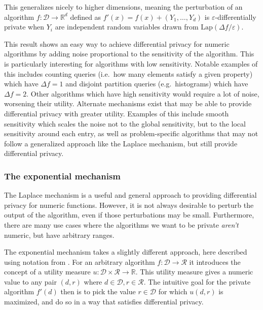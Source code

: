 \documentclass[a4paper,12pt]{article}
\newcommand{\fancy}{\mathcal}
\renewcommand{\epsilon}{\varepsilon}
\begin{document}
This generalizes nicely to higher dimensions, meaning the perturbation of an algorithm $f : \fancy{D} \to \mathbb{R}^d$ defined as $f'(x) = f(x) + (Y_1,\dots,Y_d)$ is $\epsilon$-differentially private when $Y_i$ are independent random variables drawn from $\text{Lap}(\Delta f / \epsilon)$. 

This result shows an easy way to achieve differential privacy for numeric algorithms by adding noise proportional to the sensitivity of the algorithm. This is particularly interesting for algorithms with low sensitivity. Notable examples of this includes counting queries (i.e.\ how many elements satisfy a given property) which have $\Delta f=1$ and disjoint partition queries (e.g.\ histograms) which have $\Delta f=2$. Other algorithms which have high sensitivity would require a lot of noise, worsening their utility. Alternate mechanisms exist that may be able to provide differential privacy with greater utility. Examples of this include smooth sensitivity \cite{nissim_smoothsens} which scales the noise not to the global sensitivity, but to the local sensitivity around each entry, as well as problem-specific algorithms that may not follow a generalized approach like the Laplace mechanism, but still provide differential privacy.

\subsubsection{The exponential mechanism}

The Laplace mechanism is a useful and general approach to providing differential privacy for numeric functions. However, it is not always desirable to perturb the output of the algorithm, even if those perturbations may be small. Furthermore, there are many use cases where the algorithms we want to be private \emph{aren't} numeric, but have arbitrary ranges.

The exponential mechanism \cite{sherry_exponentialmech} takes a slightly different approach, here described using notation from \cite{dwork_privacybook}. For an arbitrary algorithm $f : \fancy{D} \to \fancy{R}$ it introduces the concept of a utility measure $u : \fancy{D} \times \fancy{R} \to \mathbb{R}$. This utility measure gives a numeric value to any pair $(d,r)$ where $d \in \fancy{D}, r \in \fancy{R}$. The intuitive goal for the private algorithm $f'(d)$ then is to pick the value $r \in \fancy{D}$ for which $u(d,r)$ is maximized, and do so in a way that satisfies differential privacy.
\end{document}
